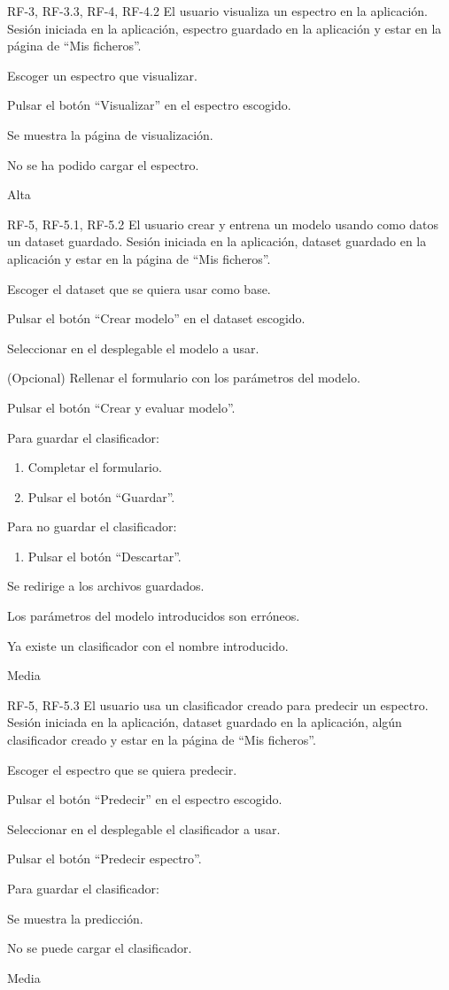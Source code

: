 {RF-3, RF-3.3, RF-4, RF-4.2}
{El usuario visualiza un espectro en la aplicación.}
{Sesión iniciada en la aplicación, espectro guardado en la aplicación y estar 
en la página de ``Mis ficheros''.}
{
	\item Escoger un espectro que visualizar.
	\item Pulsar el botón ``Visualizar'' en el espectro escogido.
}
{Se muestra la página de visualización.}
{	\item No se ha podido cargar el espectro.
}
{Alta}

{RF-5, RF-5.1, RF-5.2}
{El usuario crear y entrena un modelo usando como datos un dataset guardado.}
{Sesión iniciada en la aplicación, dataset guardado en la aplicación y estar en 
la página de ``Mis ficheros''.}
{
	\item Escoger el dataset que se quiera usar como base.
	\item Pulsar el botón ``Crear modelo'' en el dataset escogido.
	\item Seleccionar en el desplegable el modelo a usar.
	\item (Opcional) Rellenar el formulario con los parámetros del modelo.
	\item Pulsar el botón ``Crear y evaluar modelo''.
	\item Para guardar el clasificador:
	\begin{enumerate}
		\item Completar el formulario.
		\item Pulsar el botón ``Guardar''.
	\end{enumerate}
	\item Para no guardar el clasificador:
	\begin{enumerate}
		\item Pulsar el botón ``Descartar''.
	\end{enumerate}
}
{Se redirige a los archivos guardados.}
{	\item Los parámetros del modelo introducidos son erróneos.
	\item Ya existe un clasificador con el nombre introducido.
}
{Media}

{RF-5, RF-5.3}
{El usuario usa un clasificador creado para predecir un espectro.}
{Sesión iniciada en la aplicación, dataset guardado en la aplicación, algún 
clasificador creado y estar en la página de ``Mis ficheros''.}
{
	\item Escoger el espectro que se quiera predecir.
	\item Pulsar el botón ``Predecir'' en el espectro escogido.
	\item Seleccionar en el desplegable el clasificador a usar.
	\item Pulsar el botón ``Predecir espectro''.
	\item Para guardar el clasificador:
}
{Se muestra la predicción.}
{	\item No se puede cargar el clasificador.
}
{Media}

